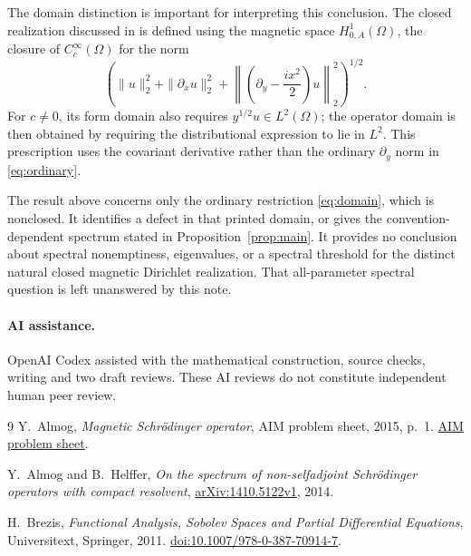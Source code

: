 \documentclass[11pt,a4paper]{article}
\begin{document}
The domain distinction is important for interpreting this conclusion.
The closed realization discussed in \cite[pp.~6 and~12,
equations~(2.3), (2.4), and~(2.24)]{AlmogHelffer} is defined using the
magnetic space $H^1_{0,A}(\Omega)$, the closure of $C_c^\infty(\Omega)$ for
the norm
\[
 \left(\|u\|_2^2+\|\partial_xu\|_2^2+
 \left\|\left(\partial_y-\frac{ix^2}{2}\right)u\right\|_2^2\right)^{1/2}.
\]
For $c\ne0$, its form domain also requires $y^{1/2}u\in L^2(\Omega)$;
the operator domain is then obtained by requiring the distributional
expression to lie in $L^2$. This prescription uses the covariant derivative
rather than the ordinary $\partial_y$ norm in \eqref{eq:ordinary}.

The result above concerns only the ordinary restriction \eqref{eq:domain},
which is nonclosed. It identifies a defect in that printed domain, or gives
the convention-dependent spectrum stated in Proposition~\ref{prop:main}.
It provides no conclusion about spectral nonemptiness, eigenvalues, or a
spectral threshold for the distinct natural closed magnetic
Dirichlet realization. That all-parameter spectral question is left
unanswered by this note.

\paragraph{AI assistance.}
OpenAI Codex assisted with the mathematical construction, source checks,
writing and two draft reviews. These AI reviews do not constitute independent
human peer review.

\begin{thebibliography}{9}
Y.~Almog, \emph{Magnetic Schr\"odinger operator}, AIM problem sheet,
2015, p.~1.
\href{https://nsa.fjfi.cvut.cz/problems/04_AIM_2015/2015-02/2015-02_AIM_Almog_2.pdf}{AIM problem sheet}.

Y.~Almog and B.~Helffer, \emph{On the spectrum of non-selfadjoint
Schr\"odinger operators with compact resolvent},
\href{https://arxiv.org/abs/1410.5122v1}{arXiv:1410.5122v1}, 2014.

H.~Brezis, \emph{Functional Analysis, Sobolev Spaces and Partial Differential
Equations}, Universitext, Springer, 2011.
\href{https://doi.org/10.1007/978-0-387-70914-7}{doi:10.1007/978-0-387-70914-7}.
\end{thebibliography}
\end{document}
